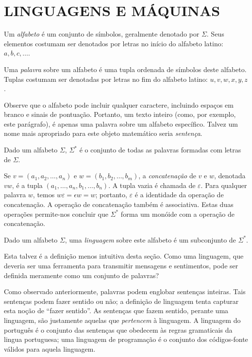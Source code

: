 \section{LINGUAGENS E MÁQUINAS}

\begin{definition}
    Um \emph{alfabeto}
    é um conjunto de símbolos,
    geralmente denotado por $\Sigma$.
    Seus elementos costumam ser denotados
    por letras no início do alfabeto latino:
    $a, b, c, \dots$.
\end{definition}
\begin{definition}
    Uma \emph{palavra} sobre um alfabeto
    é uma tupla ordenada de símbolos deste alfabeto.
    Tuplas costumam ser denotadas
    por letras no fim do alfabeto latino:
    $u, v, w, x, y, z$.
\end{definition}

Observe que o alfabeto
pode incluir qualquer caractere,
incluindo espaços em branco
e sinais de pontuação.
Portanto,
um texto inteiro
(como, por exemplo, este parágrafo),
é apenas uma palavra sobre um alfabeto específico.
Talvez um nome mais apropriado para este objeto matemático
seria \emph{sentença}.

\begin{definition}
    Dado um alfabeto $\Sigma$,
    $\Sigma^*$ é o conjunto de todas as palavras
    formadas com letras de $\Sigma$.
\end{definition}
Se $v = (a_1, a_2, \dots, a_n)$
e $w = (b_1, b_2, \dots, b_m)$,
a \emph{concatenação} de $v$ e $w$,
denotada $vw$,
é a tupla $(a_1, \dots, a_n, b_1, \dots, b_n)$.
A tupla vazia é chamada de $\varepsilon$.
Para qualquer palavra $w$,
temos $w\varepsilon = \epsilon w = w$;
portanto,
$\varepsilon$ é a identidade da operação de concatenação.
A operação de concatenação também é associativa.
Estas duas operações permite-nos concluir
que $\Sigma^*$ forma um monóide
com a operação de concatenação.

\begin{definition}
    Dado um alfabeto $\Sigma$,
    uma \emph{linguagem} sobre este alfabeto
    é um subconjunto de $\Sigma^*$.
\end{definition}
Esta talvez é a definição menos intuitiva desta seção.
Como uma linguagem,
que deveria ser uma ferramenta para transmitir mensagens
e sentimentos,
pode ser definida
meramente como um conjunto de palavras?

Como observado anteriormente,
palavras podem englobar sentenças inteiras.
Tais sentenças podem fazer sentido ou não;
a definição de linguagem
tenta capturar esta noção de ``fazer sentido''.
As sentenças que fazem sentido,
perante uma linguagem,
são justamente aquelas que \emph{pertencem} à linguagem.
A linguagem do português
é o conjunto das sentenças
que obedecem às regras gramaticais
da lingua portuguesa;
uma linguagem de programação
é o conjunto dos códigos-fonte válidos para aquela linguagem.

